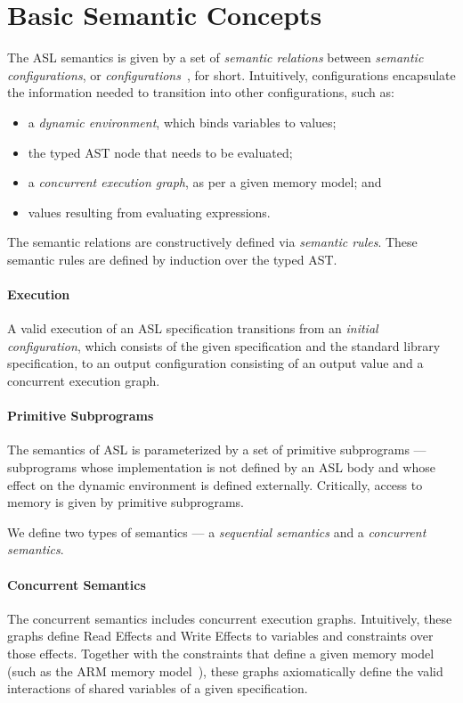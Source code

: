 \documentclass{book}
\begin{document}
\section{Basic Semantic Concepts}
The ASL semantics is given by a set of \emph{semantic relations} between \emph{semantic configurations},
or \emph{configurations}~\cite{SemanticsWithApplicationsBook}, for short.
Intuitively, configurations encapsulate the information needed to transition into other configurations,
such as:
\begin{itemize}
  \item a \emph{dynamic environment}, which binds variables to values;
  \item the typed AST node that needs to be evaluated;
  \item a \emph{concurrent execution graph}, as per a given memory model; and
  \item values resulting from evaluating expressions.
\end{itemize}
The semantic relations are constructively defined via \emph{semantic rules}.
These semantic rules are defined by induction over the typed AST.

\paragraph{Execution}
A valid execution of an ASL specification transitions from an \emph{initial configuration},
which consists of the given specification and the standard library specification, to an output configuration
consisting of an output value and a concurrent execution graph.

\paragraph{Primitive Subprograms}
The semantics of ASL is parameterized by a set of primitive subprograms ---
subprograms whose implementation is not defined by an ASL body and whose effect on the dynamic environment
is defined externally. Critically, access to memory is given by primitive subprograms.

We define two types of semantics --- a \emph{sequential semantics} and a \emph{concurrent semantics}.

\paragraph{Concurrent Semantics}
The concurrent semantics includes concurrent execution graphs.
Intuitively, these graphs define Read Effects and Write Effects to variables and constraints over those effects.
Together with the constraints that define a given memory model (such as the ARM memory model~\cite{AlglaveDGHM21}),
these graphs axiomatically define
the valid interactions of shared variables of a given specification.
\end{document}
